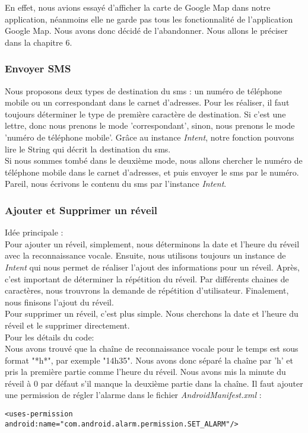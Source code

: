 \indent En effet, nous avions essayé d'afficher la carte de Google Map dans notre application, néanmoins elle ne garde pas tous les fonctionnalité de l'application Google Map. Nous avons donc décidé de l'abandonner. Nous allons le préciser dans la chapitre 6.\\

\subsubsection{Envoyer SMS}
\indent Nous proposons deux types de destination du sms : un numéro de téléphone mobile ou un correspondant dans le carnet d'adresses.  Pour les réaliser, il faut toujours déterminer le type de première caractère de destination. Si c'est une lettre, donc nous prenons le mode 'correspondant', sinon, nous prenons le mode 'numéro de téléphone mobile'. Grâce au instance \emph{Intent}, notre fonction pouvons lire le String qui décrit la destination du sms. \\

\indent Si nous sommes tombé dans le deuxième mode, nous allons chercher le numéro de téléphone mobile dans le carnet d'adresses, et puis envoyer le sms par le numéro.\\

\indent Pareil, nous écrivons le contenu du sms par l'instance \emph{Intent}.
	
\subsubsection{Ajouter et Supprimer un réveil}
\indent Idée principale : \\
\indent Pour ajouter un réveil, simplement, nous déterminons la date et l'heure du réveil avec la reconnaissance vocale. Ensuite, nous utilisons toujours un instance de \emph{Intent} qui nous permet de réaliser l'ajout des informations pour un réveil. Après, c'est important de déterminer la répétition du réveil. Par différents chaines de caractères, nous trouvrons la demande de répétition d'utilisateur. Finalement, nous finisons l'ajout du réveil.\\

\indent Pour supprimer un réveil, c'est plus simple. Nous cherchons la date et l'heure du réveil et le supprimer directement.\\

\indent Pour les détails du code: \\
\indent Nous avons trouvé que la chaîne de reconnaissance vocale pour le temps est sous format "*h*", par exemple "14h35". Nous avons donc séparé la chaîne par 'h' et pris la première partie comme l'heure du réveil. Nous avons mis la minute du réveil à 0 par défaut s'il manque la deuxième partie dans la chaîne. Il faut ajouter une permission de régler l'alarme dans le fichier \emph{AndroidManifest.xml} : \\
	\begin{lstlisting}[frame=none,aboveskip=-1em]
	<uses-permission android:name="com.android.alarm.permission.SET_ALARM"/>
	\end{lstlisting}

